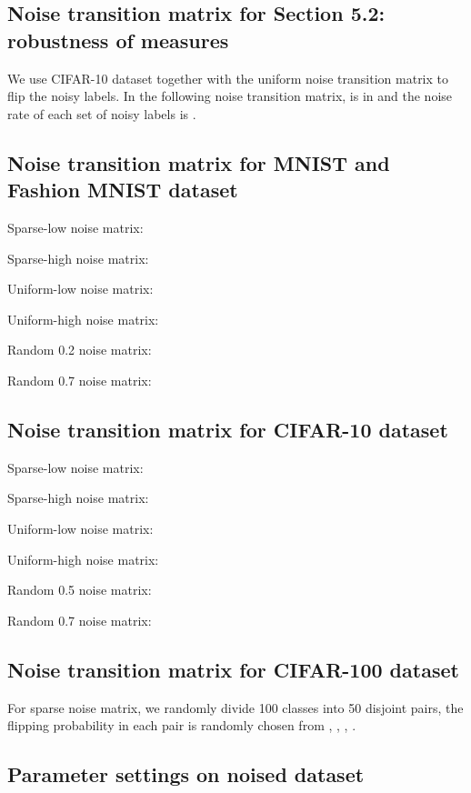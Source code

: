 \documentclass{article}
\begin{document}
\subsection{Noise transition matrix for Section 5.2: robustness of  measures}
We use CIFAR-10 dataset together with the uniform noise transition matrix to flip the noisy labels. In the following noise transition matrix,  is in  and the noise rate of each set of noisy labels is .

{\tiny{}}

\subsection{Noise transition matrix for MNIST and Fashion MNIST dataset}

Sparse-low noise matrix:
{\tiny{}}

\noindent Sparse-high noise matrix:
{\tiny{}}

\noindent Uniform-low noise matrix:
{\tiny{}}

\noindent Uniform-high noise matrix:
{\tiny{}}

\noindent Random 0.2 noise matrix:
{\tiny{}}



\noindent Random 0.7 noise matrix:
{\tiny{}}


\subsection{Noise transition matrix for CIFAR-10 dataset}
Sparse-low noise matrix:
{\tiny{}}

\noindent Sparse-high noise matrix:
{\tiny{}}

\noindent Uniform-low noise matrix:
{\tiny{}}

\noindent Uniform-high noise matrix:
{\tiny{}}


\noindent Random 0.5 noise matrix:
{\tiny{}}



\noindent Random 0.7 noise matrix:
{\tiny{}}


\subsection{Noise transition matrix for CIFAR-100 dataset}
For sparse noise matrix, we randomly divide 100 classes into 50 disjoint pairs, the flipping probability  in each pair is randomly chosen from , , , . 


\subsection{Parameter settings  on noised dataset}
\end{document}
